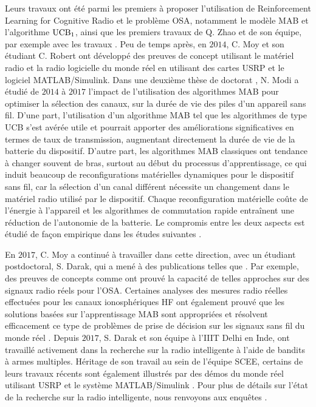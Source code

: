 \begin{resume_fr}
Leurs travaux ont été parmi les premiers à proposer l'utilisation de Reinforcement Learning for Cognitive Radio et le problème OSA, notamment le modèle MAB et l'algorithme $\mathrm{UCB}_1$,
ainsi que les premiers travaux de Q. Zhao et de son équipe, par exemple avec les travaux \cite{Liu08,Zhao10}.
%
Peu de temps après, en $2014$, C. Moy et son étudiant C. Robert \cite{RobertSDR2014,MoyWSR2014,MoyWSR2014} ont développé des preuves de concept utilisant le matériel radio et la radio logicielle du monde réel en utilisant des cartes USRP et le logiciel MATLAB/Simulink.
Dans une deuxième thèse de doctorat \cite{Modi17PhD}, N. Modi a étudié de $2014$ à $2017$ l'impact de l'utilisation des algorithmes MAB pour optimiser la sélection des canaux, sur la durée de vie des piles d'un appareil sans fil.
D'une part, l'utilisation d'un algorithme MAB tel que les algorithmes de type UCB s'est avérée utile et pourrait apporter des améliorations significatives en termes de taux de transmission, augmentant directement la durée de vie de la batterie du dispositif.
D'autre part, les algorithmes MAB classiques ont tendance à changer souvent de bras, surtout au début du processus d'apprentissage, ce qui induit beaucoup de reconfigurations matérielles dynamiques pour le dispositif sans fil, car la sélection d'un canal différent nécessite un changement dans le matériel radio utilisé par le dispositif.
Chaque reconfiguration matérielle coûte de l'énergie à l'appareil et les algorithmes de commutation rapide entraînent une réduction de l'autonomie de la batterie.
Le compromis entre les deux aspects est étudié de façon empirique dans les études suivantes
\cite{modiDemo2016}.


En $2017$, C. Moy a continué à travailler dans cette direction, avec un étudiant postdoctoral, S. Darak, qui a mené à des publications telles que
\cite{darak2016bayesian,Darak16}.
%
Par exemple, des preuves de concepts comme \cite{kumar2016two} ont prouvé la capacité de telles approches sur des signaux radio réels pour l'OSA.
%
Certaines analyses des mesures radio réelles effectuées pour les canaux ionosphériques HF ont également prouvé que les solutions basées sur l'apprentissage MAB sont appropriées et résolvent efficacement ce type de problèmes de prise de décision sur les signaux sans fil du monde réel \cite{Melian15}.
%
Depuis $2017$, S. Darak et son équipe à l'IIIT Delhi en Inde, ont travaillé activement dans la recherche sur la radio intelligente à l'aide de bandits à armes multiples.
Héritage de son travail au sein de l'équipe SCEE,
certains de leurs travaux récents sont également illustrés par des démos du monde réel utilisant USRP et le système MATLAB/Simulink
\cite{KumarYadav2018,SawantKumar2018,JoshiKumar2018}.
%
Pour plus de détails sur l'état de la recherche sur la radio intelligente, nous renvoyons aux enquêtes \cite{garhwal2012survey,marinho2012cognitive}.



\end{resume_fr}
